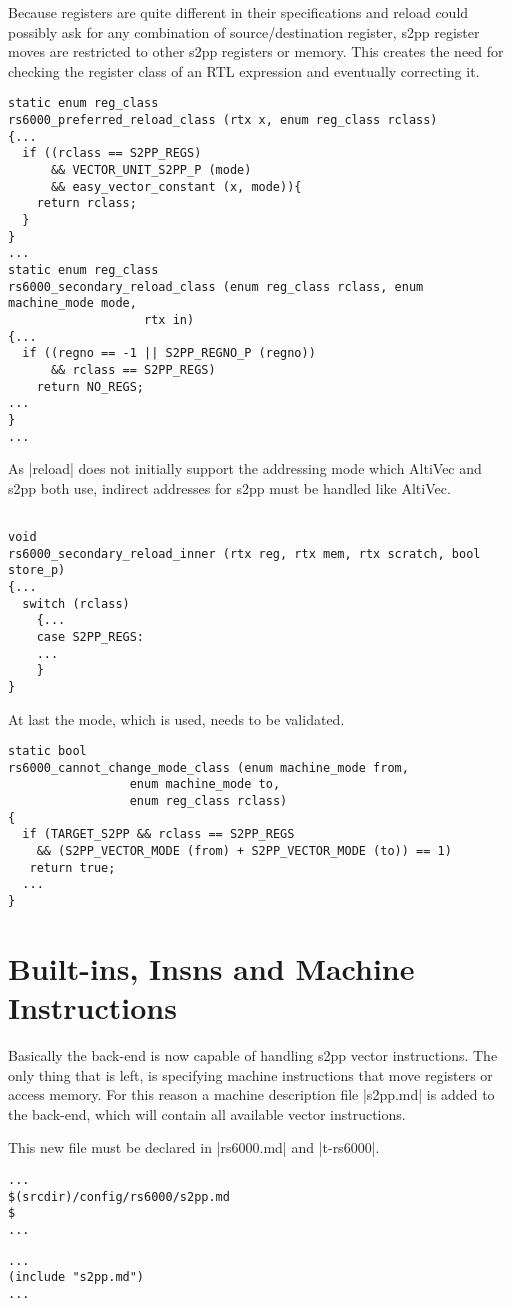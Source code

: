 Because registers are quite different in their specifications and reload could possibly ask for any combination of source/destination register, \ac{s2pp} register moves are restricted to other \ac{s2pp} registers or memory.
This creates the need for checking the register class of an \ac{RTL} expression and eventually correcting it.
\begin{lstlisting}
static enum reg_class
rs6000_preferred_reload_class (rtx x, enum reg_class rclass)
{...
  if ((rclass == S2PP_REGS)
      && VECTOR_UNIT_S2PP_P (mode)
      && easy_vector_constant (x, mode)){
    return rclass;
  }
}
...
static enum reg_class
rs6000_secondary_reload_class (enum reg_class rclass, enum machine_mode mode,
                   rtx in)
{...
  if ((regno == -1 || S2PP_REGNO_P (regno))
      && rclass == S2PP_REGS)
    return NO_REGS;
...
}
...
\end{lstlisting}

As |reload| does not initially support the addressing mode which AltiVec and \ac{s2pp} both use, indirect addresses for \ac{s2pp} must be handled like AltiVec.
\begin{lstlisting}

void
rs6000_secondary_reload_inner (rtx reg, rtx mem, rtx scratch, bool store_p)
{...
  switch (rclass)
    {...
    case S2PP_REGS:
    ...
    }
}
\end{lstlisting}

At last the mode, which is used, needs to be validated.
\begin{lstlisting}
static bool
rs6000_cannot_change_mode_class (enum machine_mode from,
                 enum machine_mode to,
                 enum reg_class rclass)
{
  if (TARGET_S2PP && rclass == S2PP_REGS
    && (S2PP_VECTOR_MODE (from) + S2PP_VECTOR_MODE (to)) == 1)
   return true;
  ...
}
\end{lstlisting}

\section{Built-ins, Insns and Machine Instructions}
\label{sec:builtins}
Basically the back-end is now capable of handling \ac{s2pp} vector instructions.
The only thing that is left, is specifying machine instructions that move registers or access memory.
For this reason a machine description file |s2pp.md| is added to the back-end, which will contain all available vector instructions.

This new file must be declared in |rs6000.md| and |t-rs6000|.
\begin{lstlisting}
...
$(srcdir)/config/rs6000/s2pp.md
$
...
\end{lstlisting}
\begin{lstlisting}
...
(include "s2pp.md")
...
\end{lstlisting}


